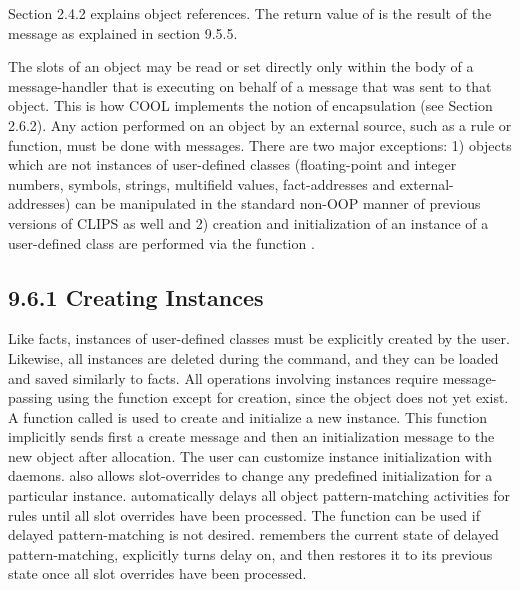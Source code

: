 \documentclass[letterpaper,10pt,english]{sphinxmanual}
\begin{document}
Section 2.4.2 explains object references. The return value of 
is the result of the message as explained in section 9.5.5.

The slots of an object may be read or set directly only within the body
of a message-handler that is executing on behalf of a message that was
sent to that object. This is how COOL implements the notion of
encapsulation (see Section 2.6.2). Any action performed on an object by
an external source, such as a rule or function, must be done with
messages. There are two major exceptions: 1) objects which are not
instances of user-defined classes (floating-point and integer numbers,
symbols, strings, multifield values, fact-addresses and
external-addresses) can be manipulated in the standard non-OOP manner of
previous versions of CLIPS as well and 2) creation and initialization of
an instance of a user-defined class are performed via the function
.


\subsection{9.6.1 Creating Instances}
\label{\detokenize{cool:creating-instances}}
Like facts, instances of user-defined classes must be explicitly created
by the user. Likewise, all instances are deleted during the 
command, and they can be loaded and saved similarly to facts. All
operations involving instances require message-passing using the
 function except for creation, since the object does not yet
exist. A function called  is used to create and
initialize a new instance. This function implicitly sends first a create
message and then an initialization message to the new object after
allocation. The user can customize instance initialization with daemons.
 also allows slot-overrides to change any predefined
initialization for a particular instance. 
automatically delays all object pattern-matching activities for rules
until all slot overrides have been processed. The function
 can be used if delayed pattern-matching is not
desired.  remembers the current state of delayed
pattern-matching, explicitly turns delay on, and then restores it to its
previous state once all slot overrides have been processed.

\end{document}
